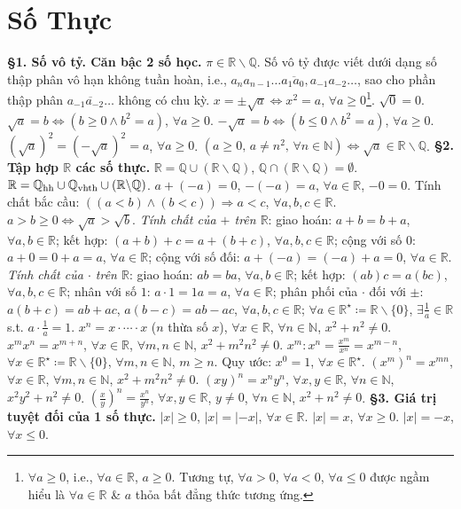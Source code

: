 \documentclass{article}
\numberwithin{equation}{section}
\begin{document}
\section{Số Thực}
\textbf{\S1. Số vô tỷ. Căn bậc 2 số học.} $\pi\in\mathbb{R}\backslash\mathbb{Q}$. Số vô tỷ được viết dưới dạng số thập phân vô hạn không tuần hoàn, i.e., $\overline{a_na_{n-1}\ldots a_1a_0,a_{-1}a_{-2}\ldots}$, sao cho phần thập phân $\overline{a_{-1}a_{-2}\ldots}$ không có chu kỳ. $x = \pm\sqrt{a}\Leftrightarrow x^2 = a$, $\forall a\ge 0$\footnote{$\forall a\ge 0$, i.e., $\forall a\in\mathbb{R}$, $a\ge 0$. Tương tự, $\forall a > 0$, $\forall a < 0$, $\forall a\le 0$ được ngầm hiểu là $\forall a\in\mathbb{R}$ \& $a$ thỏa bất đẳng thức tương ứng.}. $\sqrt{0} = 0$. $\sqrt{a} = b\Leftrightarrow(b\ge 0\land b^2 = a)$, $\forall a\ge 0$. $-\sqrt{a} = b\Leftrightarrow(b\le 0\land b^2 = a)$, $\forall a\ge 0$. $(\sqrt{a})^2 = (-\sqrt{a})^2 = a$, $\forall a\ge 0$. $(a\ge 0,\,a\ne n^2,\,\forall n\in\mathbb{N})\Leftrightarrow\sqrt{a}\in\mathbb{R}\backslash\mathbb{Q}$. \textbf{\S2. Tập hợp $\mathbb{R}$ các số thực.} $\mathbb{R} = \mathbb{Q}\cup(\mathbb{R}\backslash\mathbb{Q})$, $\mathbb{Q}\cap(\mathbb{R}\backslash\mathbb{Q}) = \emptyset$. $\mathbb{R} = \mathbb{Q}_{\rm hh}\cup\mathbb{Q}_{\rm vhth}\cup(\mathbb{R}\backslash\mathbb{Q})$. $a + (-a) = 0$, $-(-a) = a$, $\forall a\in\mathbb{R}$, $-0 = 0$. Tính chất bắc cầu: $((a < b)\land(b < c))\Rightarrow a < c$, $\forall a,b,c\in\mathbb{R}$. $a > b\ge 0\Leftrightarrow\sqrt{a} > \sqrt{b}$. \textit{Tính chất của $+$ trên $\mathbb{R}$}: giao hoán: $a + b = b + a$, $\forall a,b\in\mathbb{R}$; kết hợp: $(a + b) + c = a + (b + c)$, $\forall a,b,c\in\mathbb{R}$; cộng với số $0$: $a + 0 = 0 + a = a$, $\forall a\in\mathbb{R}$; cộng với số đối: $a + (-a) = (-a) + a = 0$, $\forall a\in\mathbb{R}$. \textit{Tính chất của $\cdot$ trên $\mathbb{R}$}: giao hoán: $ab = ba$, $\forall a,b\in\mathbb{R}$; kết hợp: $(ab)c = a(bc)$, $\forall a,b,c\in\mathbb{R}$; nhân với số $1$: $a\cdot 1 = 1a = a$, $\forall a\in\mathbb{R}$; phân phối của $\cdot$ đối với $\pm$: $a(b + c) = ab + ac$, $a(b - c) = ab - ac$, $\forall a,b,c\in\mathbb{R}$; $\forall a\in\mathbb{R}^\star\coloneqq\mathbb{R}\backslash\{0\}$, $\exists\frac{1}{a}\in\mathbb{R}$ s.t. $a\cdot\frac{1}{a} = 1$. $x^n = x\cdot\cdots\cdot x$ ($n$ thừa số $x$), $\forall x\in\mathbb{R}$, $\forall n\in\mathbb{N}$, $x^2 + n^2\ne 0$. $x^mx^n = x^{m + n}$, $\forall x\in\mathbb{R}$, $\forall m,n\in\mathbb{N}$, $x^2 + m^2n^2\ne 0$. $x^m:x^n = \frac{x^m}{x^n} = x^{m - n}$, $\forall x\in\mathbb{R}^\star\coloneqq\mathbb{R}\backslash\{0\}$, $\forall m,n\in\mathbb{N}$, $m\ge n$. Quy ước: $x^0 = 1$, $\forall x\in\mathbb{R}^\star$. $(x^m)^n = x^{mn}$, $\forall x\in\mathbb{R}$, $\forall m,n\in\mathbb{N}$, $x^2 + m^2n^2\ne 0$. $(xy)^n = x^ny^n$, $\forall x,y\in\mathbb{R}$, $\forall n\in\mathbb{N}$, $x^2y^2 + n^2\ne 0$. $\left(\frac{x}{y}\right)^n = \frac{x^n}{y^n}$, $\forall x,y\in\mathbb{R}$, $y\ne 0$, $\forall n\in\mathbb{N}$, $x^2 + n^2\ne 0$. \textbf{\S3. Giá trị tuyệt đối của 1 số thực.} $|x|\ge 0$, $|x| = |-x|$, $\forall x\in\mathbb{R}$. $|x| = x$, $\forall x\ge 0$. $|x| = -x$, $\forall x\le 0$.
\end{document}

